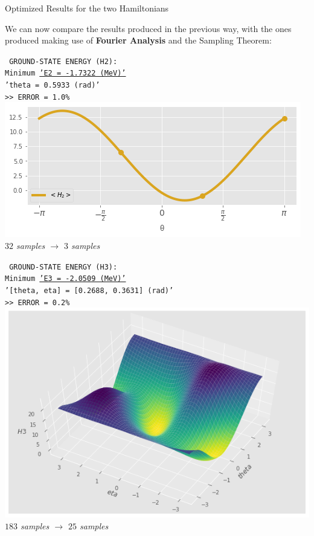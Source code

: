 \documentclass[9pt, handout, aspectratio=169]{beamer}		%
\begin{document}
	\begin{frame}{Optimized Results for the two Hamiltonians}

		We can now compare the results produced in the previous way, with the ones produced making use of \textbf{Fourier Analysis} and the Sampling Theorem:

		\begin{multicols}{2}

			\begin{center}
				\texttt{ \small
					GROUND-STATE ENERGY (H2): \\
					Minimum \underline{'E2 = -1.7322 (MeV)'} \\
					'theta = 0.5933 (rad)' \\
					>> ERROR = 1.0\% } \\
				\smallskip
				\includegraphics[width=.34\paperwidth]{Figures/h2_optimization} \\
				\small{\emph{$32$ samples $\rightarrow$ $3$ samples}}
			\end{center}

			\columnbreak

			\begin{center}
				\texttt{ \small
					GROUND-STATE ENERGY (H3): \\
					Minimum \underline{'E3 = -2.0509 (MeV)'} \\
					'[theta, eta] = [0.2688, 0.3631] (rad)' \\
					>> ERROR = 0.2\% } \\
				\smallskip
				\includegraphics[width=.34\paperwidth]{Figures/h3_optimization} \\
				\small{\emph{$183$ samples $\rightarrow$ $25$ samples}}
			\end{center}


\end{multicols}
\end{frame}
\end{document}

